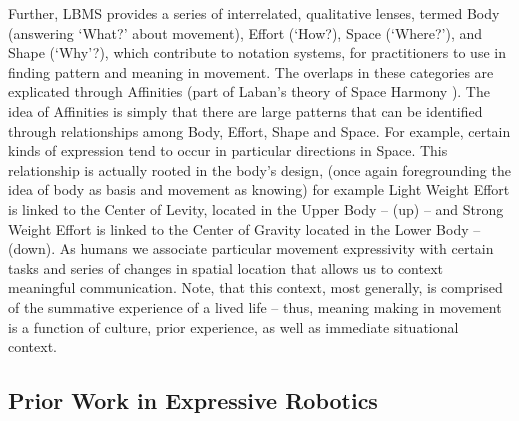 \documentclass[arts,article,submit,moreauthors,pdftex,10pt,a4paper]{mdpi}
\begin{document}
Further, LBMS provides a series of interrelated, qualitative lenses, termed Body (answering `What?' about movement), Effort (`How?), Space (`Where?'), and Shape (`Why'?), which contribute to notation systems, for practitioners to use in finding pattern and meaning in movement.  The overlaps in these categories are explicated through Affinities (part of Laban’s theory of Space Harmony \cite{laban1971mastery}).   %
The idea of Affinities is simply that there are large patterns that can be identified through relationships among Body, Effort, Shape and Space. For example, certain kinds of expression tend to occur in particular directions in Space. This relationship is actually rooted in the body’s design, (once again foregrounding the idea of body as basis and movement as knowing) for example Light Weight Effort is linked to the Center of Levity, located in the Upper Body -- (up) -- and Strong Weight Effort is linked to the Center of Gravity located in the Lower Body -- (down). As humans we associate particular movement expressivity with certain tasks and series of changes in spatial location that allows us to context meaningful communication.  Note, that this context, most generally, is comprised of the summative experience of a lived life -- thus, meaning making in movement is a function of culture, prior experience, as well as immediate situational context. %


\subsection{Prior Work in Expressive Robotics}
\end{document}
